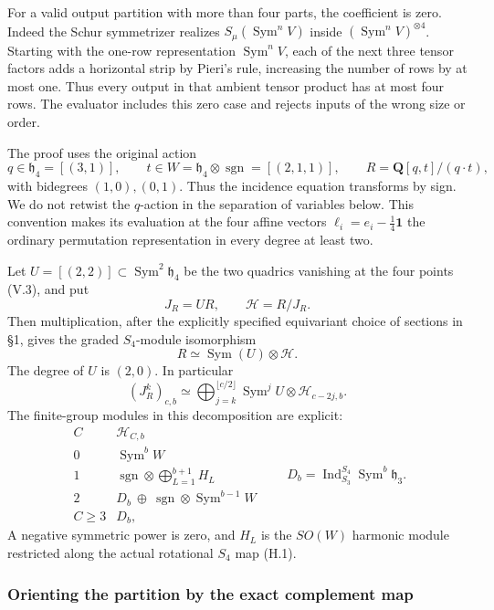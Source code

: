 \documentclass[
  10pt,
]{article}
\begin{document}
For a valid output partition with more than four parts, the coefficient
is zero. Indeed the Schur symmetrizer realizes
\(S_\mu(\operatorname{Sym}^nV)\) inside
\((\operatorname{Sym}^nV)^{\otimes4}\). Starting with the one-row
representation \(\operatorname{Sym}^nV\), each of the next three tensor
factors adds a horizontal strip by Pieri's rule, increasing the number
of rows by at most one. Thus every output in that ambient tensor product
has at most four rows. The evaluator includes this zero case and rejects
inputs of the wrong size or order.

The proof uses the original action \[
q\in\mathfrak h_4=[(3,1)],\qquad
t\in W=\mathfrak h_4\otimes\operatorname{sgn}=[(2,1,1)],
\qquad
R=\mathbf Q[q,t]/(q\cdot t),
\tag{A.1}
\] with bidegrees \((1,0),(0,1)\). Thus the incidence equation
transforms by sign. We do not retwist the \(q\)-action in the separation
of variables below. This convention makes its evaluation at the four
affine vectors \(\ell_i=e_i-\frac14\mathbf1\) the ordinary permutation
representation in every degree at least two.

Let \(U=[(2,2)]\subset\operatorname{Sym}^2\mathfrak h_4\) be the two
quadrics vanishing at the four points (V.3), and put \[
J_R=UR,\qquad \mathcal H=R/J_R.
\tag{A.2}
\] Then multiplication, after the explicitly specified equivariant
choice of sections in §1, gives the graded \(S_4\)-module isomorphism \[
\boxed{
R\simeq\operatorname{Sym}(U)\otimes\mathcal H.}
\tag{A.3}
\] The degree of \(U\) is \((2,0)\). In particular \[
\boxed{
(J_R^k)_{c,b}
\simeq\bigoplus_{j=k}^{\lfloor c/2\rfloor}
\operatorname{Sym}^j U\otimes\mathcal H_{c-2j,b}.}
\tag{A.4}
\] The finite-group modules in this decomposition are explicit: \[
\boxed{
\begin{array}{c|l}
C&\mathcal H_{C,b}\\ \hline
0&\operatorname{Sym}^b W\\
1&\displaystyle\operatorname{sgn}\otimes
       \bigoplus_{L=1}^{b+1}H_L\\
2&\displaystyle D_b\ \oplus\
       \operatorname{sgn}\otimes\operatorname{Sym}^{b-1}W\\
C\ge3&D_b,
\end{array}}
\qquad
D_b=\operatorname{Ind}_{S_3}^{S_4}\operatorname{Sym}^b\mathfrak h_3.
\tag{A.5}
\] A negative symmetric power is zero, and \(H_L\) is the \(SO(W)\)
harmonic module restricted along the actual rotational \(S_4\) map
(H.1).

\subsubsection{Orienting the partition by the exact complement
map}\label{orienting-the-partition-by-the-exact-complement-map}
\end{document}

